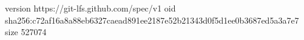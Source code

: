 version https://git-lfs.github.com/spec/v1
oid sha256:c72af16a8a88eb6327caead891ee2187e52b21343d0f5d1ee0b3687ed5a3a7e7
size 527074
